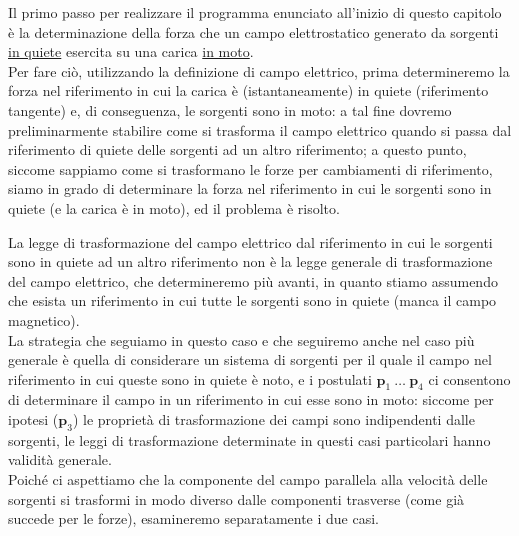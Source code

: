 Il primo passo per realizzare il programma enunciato all'inizio di questo
capitolo \`e la determinazione della forza che un campo elettrostatico generato
da sorgenti \underline{in quiete} esercita su una carica \underline{in moto}.\\
Per fare ci\`o, utilizzando la definizione di campo elettrico, prima
determineremo la forza nel riferimento in cui la carica \`e (istantaneamente) in
quiete (riferimento tangente) e, di conseguenza, le sorgenti sono in moto: a tal
fine dovremo preliminarmente stabilire come si trasforma il campo elettrico
quando si passa dal riferimento di quiete delle sorgenti ad un altro
riferimento; a questo punto, siccome sappiamo come si trasformano le forze per
cambiamenti di riferimento, siamo in grado di determinare la forza nel
riferimento in cui le sorgenti sono in quiete (e la carica \`e in moto), ed il
problema \`e risolto.

La legge di trasformazione del campo elettrico dal riferimento in cui le
sorgenti sono in quiete ad un altro riferimento non \`e la legge generale di
trasformazione del campo elettrico, che determineremo pi\`u avanti, in quanto
stiamo assumendo che esista un riferimento in cui tutte le sorgenti sono in
quiete (manca il campo magnetico).\\
La strategia che seguiamo in questo caso e che seguiremo anche nel caso pi\`u
generale \`e quella di considerare un sistema di sorgenti per il quale il campo
nel riferimento in cui queste sono in quiete \`e noto, e i postulati
$\mathbf p_1\ \dots\ \mathbf p_4$ ci consentono di determinare il campo in un
riferimento in cui esse sono in moto: siccome per ipotesi ($\mathbf p_3$) le
propriet\`a di trasformazione dei campi sono indipendenti dalle sorgenti, le
leggi di trasformazione determinate in questi casi particolari hanno validit\`a
generale.\\
Poich\'e ci aspettiamo che la componente del campo parallela alla velocit\`a
delle sorgenti si trasformi in modo diverso dalle componenti trasverse (come
gi\`a succede per le forze), esamineremo separatamente i due casi.

